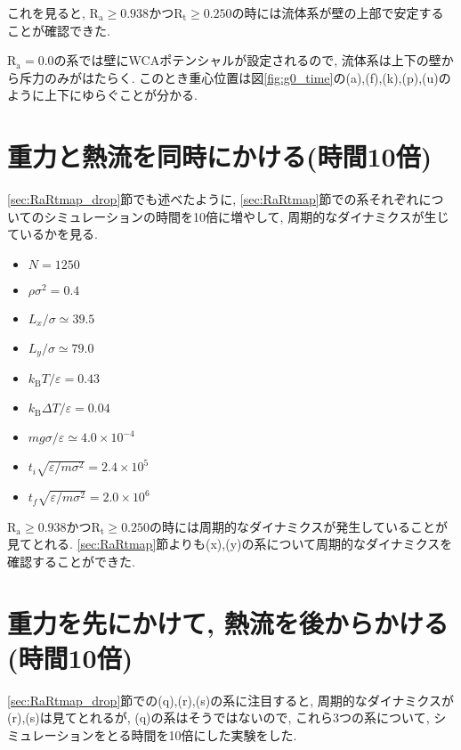 

これを見ると, $\text{R}_\text{a} \ge 0.938 かつ \text{R}_\text{t} \ge 0.250$の時には流体系が壁の上部で安定することが確認できた.

$\text{R}_\text{a}=0.0$の系では壁にWCAポテンシャルが設定されるので, 流体系は上下の壁から斥力のみがはたらく. このとき重心位置は図\ref{fig:g0_time}の(a),(f),(k),(p),(u)のように上下にゆらぐことが分かる.

\section{重力と熱流を同時にかける(時間10倍)}\label{sec:RaRtmap10}

\ref{sec:RaRtmap_drop}節でも述べたように, \ref{sec:RaRtmap}節での系それぞれについてのシミュレーションの時間を10倍に増やして, 周期的なダイナミクスが生じているかを見る. 

\begin{itemize}
  \item $N = 1250$
  \item $\rho {\sigma}^2 = 0.4$
  \item $L_x / \sigma \simeq 39.5$
  \item $L_y / \sigma \simeq 79.0$
  \item $k_{\text{B}} T / \varepsilon = 0.43$
  \item $k_{\text{B}} \Delta T / \varepsilon = 0.04$
  \item $mg\sigma/\varepsilon \simeq 4.0 \times 10^{-4}$
  \item $t_i \sqrt{\varepsilon / m \sigma^2}= 2.4 \times 10^5$
  \item $t_f \sqrt{\varepsilon / m \sigma^2} = 2.0 \times 10^{6}$
\end{itemize}



$\text{R}_\text{a} \ge 0.938 かつ\text{R}_\text{t} \ge 0.250$の時には周期的なダイナミクスが発生していることが見てとれる. \ref{sec:RaRtmap}節よりも(x),(y)の系について周期的なダイナミクスを確認することができた. 

\section{重力を先にかけて, 熱流を後からかける(時間10倍)}\label{sec:RaRtmap10_drop}

\ref{sec:RaRtmap_drop}節での(q),(r),(s)の系に注目すると, 周期的なダイナミクスが(r),(s)は見てとれるが, (q)の系はそうではないので, これら3つの系について, シミュレーションをとる時間を10倍にした実験をした. 

